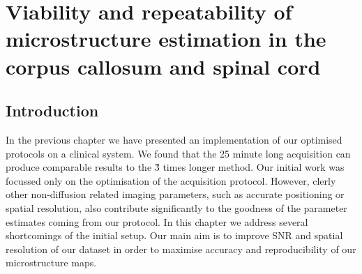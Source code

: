 
%

\newsavebox{\poorBox}
\savebox{\poorBox}{\textcolor{red}{\rule{0.05in}{0.05in}}}
\newsavebox{\fairBox}
\savebox{\fairBox}{\textcolor{orange}{\rule{0.05in}{0.05in}}}
\newsavebox{\moderateBox}
\savebox{\moderateBox}{\textcolor{yellow}{\rule{0.05in}{0.05in}}}
\newsavebox{\substantialBox}
\savebox{\substantialBox}{\textcolor{lime}{\rule{0.05in}{0.05in}}}
\newsavebox{\perfectBox}
\savebox{\perfectBox}{\textcolor{green}{\rule{0.05in}{0.05in}}}


\chapter[Microstructure estimates in CC and SC]{Viability and repeatability of microstructure estimation in the corpus callosum and spinal cord}
\section{Introduction}
In the previous chapter we have presented an implementation of our {\SFasym} optimised protocols on a clinical system. We found that the 25 minute long \SFasym{} acquisition can produce comparable results to the \~3 times longer \OI{} method. Our initial work was focussed only on the optimisation of the acquisition protocol. However, clerly other non-diffusion related imaging parameters, such as accurate positioning or spatial resolution, also contribute significantly to the goodness of the parameter estimates coming from our protocol. In this chapter we address several shortcomings of the initial \SFasym{} setup. Our main aim is to improve SNR and spatial resolution of our dataset in order to maximise accuracy and  reproducibility of our microstructure maps. 


